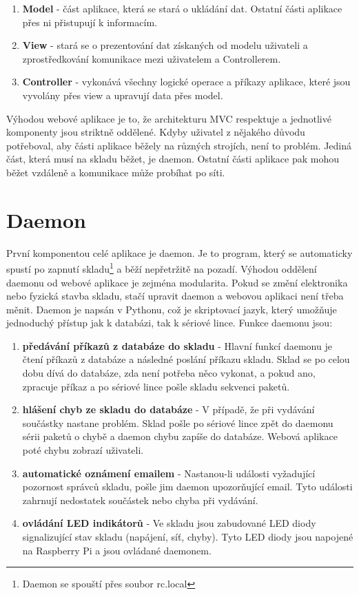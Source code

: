 \documentclass[12pt, a4paper, oneside]{article}
\begin{document}
\begin{enumerate}
\item \textbf{Model} - část aplikace, která se stará o ukládání dat. Ostatní části aplikace přes ni přistupují k informacím.
\item \textbf{View} - stará se o prezentování dat získaných od modelu uživateli a zprostředkování komunikace mezi uživatelem a Controllerem.
\item \textbf{Controller} - vykonává všechny logické operace a příkazy aplikace, které jsou vyvolány přes view a upravují data přes model.
\end{enumerate}

Výhodou webové aplikace je to, že architekturu MVC respektuje a jednotlivé komponenty jsou striktně oddělené. Kdyby uživatel z nějakého důvodu potřeboval, aby části aplikace běžely na různých strojích, není to problém. Jediná část, která musí na skladu běžet, je daemon. Ostatní části aplikace pak mohou běžet vzdáleně a komunikace může probíhat po síti.

\section{Daemon}

První komponentou celé aplikace je daemon. Je to program, který se automaticky spustí po zapnutí skladu\footnote{Daemon se spouští přes soubor rc.local} a běží nepřetržitě na pozadí. Výhodou oddělení daemonu od webové aplikace je zejména modularita. Pokud se změní elektronika nebo fyzická stavba skladu, stačí upravit daemon a webovou aplikaci není třeba měnit. Daemon je napsán v Pythonu, což je skriptovací jazyk, který umožňuje jednoduchý přístup jak k databázi, tak k sériové lince. Funkce daemonu jsou:

\begin{enumerate}
\item \textbf{předávání příkazů z databáze do skladu} - Hlavní funkcí daemonu je čtení příkazů z databáze a následné poslání příkazu skladu. Sklad se po celou dobu dívá do databáze, zda není potřeba něco vykonat, a pokud ano, zpracuje příkaz a po sériové lince pošle skladu sekvenci paketů.
\item \textbf{hlášení chyb ze skladu do databáze} - V případě, že při vydávání součástky nastane problém. Sklad pošle po sériové lince zpět do daemonu sérii paketů o chybě a daemon chybu zapíše do databáze. Webová aplikace poté chybu zobrazí uživateli.
\item \textbf{automatické oznámení emailem} - Nastanou-li události vyžadující pozornost správců skladu, pošle jim daemon upozorňující email. Tyto události zahrnují nedostatek součástek nebo chyba při vydávání.
\item \textbf{ovládání LED indikátorů} - Ve skladu jsou zabudované LED diody signalizující stav skladu (napájení, síť, chyby). Tyto LED diody jsou napojené na Raspberry Pi a jsou ovládané daemonem.
\end{enumerate}
\end{document}

